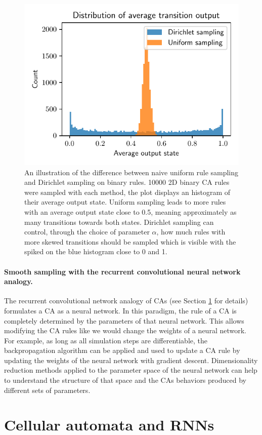\begin{figure}[htbp]
  \centering
  \includegraphics[width=.5\linewidth]{figures/ca_rule_sampling_hist}
  \caption{An illustration of the difference between naive uniform rule sampling
    and Dirichlet sampling on binary rules. 10000 2D binary CA rules were
    sampled with each method, the plot displays an histogram of their average
    output state. Uniform sampling leads to more rules with an average output
    state close to 0.5, meaning approximately as many transitions towards both
    states. Dirichlet sampling can control, through the choice of parameter $\alpha$,
    how much rules with more skewed transitions should be sampled which is
    visible with the spiked on the blue histogram close to 0 and 1.}
  \label{fig:ca_rule_sampling}
\end{figure}

\paragraph{Smooth sampling with the recurrent convolutional neural network
  analogy.}

The recurrent convolutional network analogy of \acp{CA} (see Section
\ref{sec:cell-autom-rnns} for details) formulates a \ac{CA} as a neural network.
In this paradigm, the rule of a \ac{CA} is completely determined by the parameters
of that neural network. This allows modifying the \ac{CA} rules like we would
change the weights of a neural network. For example, as long as all simulation
steps are differentiable, the backpropagation algorithm can be applied and used
to update a \ac{CA} rule by updating the weights of the neural network with
gradient descent. Dimensionality reduction methods applied to the parameter
space of the neural network can help to understand the structure of that space and
the \acp{CA} behaviors produced by different sets of parameters.


\section{Cellular automata and RNNs}\label{sec:cell-autom-rnns}

